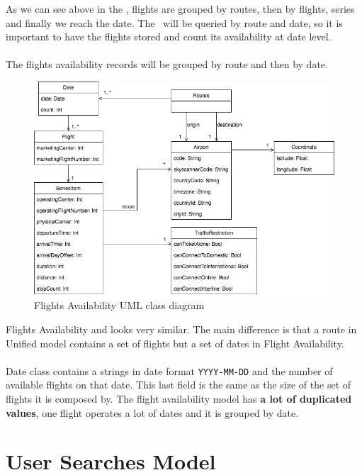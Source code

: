 As we can see above in the , flights are grouped by routes, then by flights, series and finally we reach the date. The \thesis\ will be queried by route and date, so it is important to have the flights stored and count its availability at date level.
\\\\
The flights availability records will be grouped by route and then by date.

\begin{figure}[H]
\centering
\includegraphics[scale=0.6]{diagrams/flights_availability_model.png}
\caption{Flights Availability UML\cite{uml} class diagram}
\end{figure}

Flights Availability and  looks very similar. The main difference is that a route in Unified model contains a set of flights but a set of dates in Flight Availability.
\\\\
Date class contains a strings in date format \texttt{YYYY-MM-DD} and the number of available flights on that date. This last field is the same as the size of the set of flights it is composed by. The flight availability model has \textbf{a lot of duplicated values}, one flight operates a lot of dates and it is grouped by date.


\section{User Searches Model}

